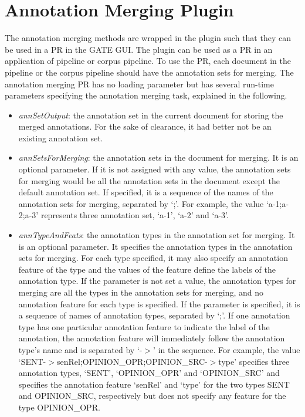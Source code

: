 \section{Annotation Merging Plugin}
The annotation merging methods are wrapped in the plugin such that they can be used
in a PR in the GATE GUI. The plugin can be used as a PR in an application of
pipeline or corpus pipeline. To use the PR, each document in the pipeline 
or the corpus pipeline should have the annotation sets for merging. The annotation
merging PR has no loading parameter but has several run-time parameters specifying the
annotation merging task, explained in the following.
\begin{itemize}
\item {\em annSetOutput}: the annotation set in the current document for storing the
merged annotations. For the sake of clearance, it had better not be an existing 
annotation set.
\item {\em annSetsForMerging}: the annotation sets in the document for merging.
It is an optional parameter.  If it is not assigned with any value, the annotation sets for
merging would be all the annotation sets in the document except the default annotation set.
If specified, it is a sequence of the names of the annotation sets for merging,
separated by `;'. For example, the value `a-1;a-2;a-3' represents
three annotation set, `a-1', `a-2' and `a-3'. 
\item {\em annTypeAndFeats}: the annotation types in the annotation set for merging.
It is an optional parameter. It specifies the annotation types in the annotation sets
for merging. For each type specified, it may also specify an annotation feature
of the type and the values of the feature define the labels of the
annotation type. If the parameter is not set a value, the annotation types
for merging are all the types in the annotation sets for merging, and no annotation
feature for each type is specified. If the parameter is specified, it is a sequence of names of 
annotation types, separated by `;'. If one annotation type has one particular
annotation feature to indicate the label of the annotation, the annotation feature
will immediately follow the annotation type's name and is separated by `-$>$' in
the sequence. For example, the value `SENT-$>$senRel;OPINION\_OPR;OPINION\_SRC-$>$type'
specifies three annotation types, `SENT', `OPINION\_OPR' and `OPINION\_SRC' and
specifies the annotation feature `senRel' and `type' for the two types SENT and 
OPINION\_SRC, respectively but does not specify any feature for the type OPINION\_OPR.

\end{itemize}
